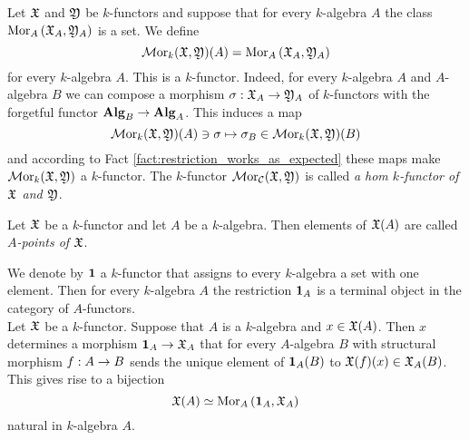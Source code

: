 \begin{definition}
Let ${\mathfrak X}$ and ${\mathfrak Y}$ be $k$-functors and suppose that for every $k$-algebra $A$ the class $\mathrm{Mor}_A\left({\mathfrak X}_A,{\mathfrak Y}_A\right)$ is a set. We define
$$\mathcal{M}\mathrm{or}_k({\mathfrak X},{\mathfrak Y})(A)=\mathrm{Mor}_A\left({\mathfrak X}_A,{\mathfrak Y}_A\right)$$
for every $k$-algebra $A$. This is a $k$-functor. Indeed, for every $k$-algebra $A$ and $A$-algebra $B$ we can compose a morphism $\sigma:{\mathfrak X}_A\rightarrow {\mathfrak Y}_A$ of $k$-functors with the forgetful functor $\mathbf{Alg}_B \rightarrow \mathbf{Alg}_A$. This induces a map 
$$\mathcal{M}\mathrm{or}_{k}({\mathfrak X},{\mathfrak Y})(A)\ni \sigma \mapsto \sigma_{B}\in \mathcal{M}\mathrm{or}_{k}({\mathfrak X},{\mathfrak Y})(B)$$
and according to Fact \ref{fact:restriction_works_as_expected} these maps make $\mathcal{M}\mathrm{or}_{k}({\mathfrak X},{\mathfrak Y})$ a $k$-functor. The $k$-functor $\mathcal{M}\mathrm{or}_{{\mathcal C}}({\mathfrak X},{\mathfrak Y})$ is called \textit{a hom $k$-functor of ${\mathfrak X}$ and ${\mathfrak Y}$}.
\end{definition}

\begin{definition}
Let ${\mathfrak X}$ be a $k$-functor and let $A$ be a $k$-algebra. Then elements of ${\mathfrak X}(A)$ are called \textit{$A$-points of ${\mathfrak X}$}.
\end{definition}
\noindent
We denote by $\mathbf{1}$ a $k$-functor that assigns to every $k$-algebra a set with one element. Then for every $k$-algebra $A$ the restriction $\mathbf{1}_A$ is a terminal object in the category of $A$-functors.\\
Let ${\mathfrak X}$ be a $k$-functor. Suppose that $A$ is a $k$-algebra and $x\in {\mathfrak X}(A)$. Then $x$ determines a morphism $\mathbf{1}_{A}\rightarrow {\mathfrak X}_A$ that for every $A$-algebra $B$ with structural morphism $f:A\rightarrow B$ sends the unique element of $\mathbf{1}_{A}(B)$ to ${\mathfrak X}(f)(x)\in {\mathfrak X}_A(B)$. This gives rise to a bijection
$${\mathfrak X}(A)\simeq \mathrm{Mor}_{A}\left(\mathbf{1}_{A},{\mathfrak X}_A\right)$$
natural in $k$-algebra $A$.

